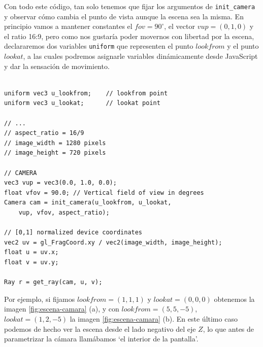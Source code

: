 Con todo este código, tan solo tenemos que fijar los argumentos de \verb|init_camera| y observar cómo cambia el punto de vista aunque la escena sea la misma. En principio vamos a mantener constantes el $fov=90^\circ$, el vector $vup=(0,1,0)$ y el ratio 16:9, pero como nos gustaría poder movernos con libertad por la escena, declararemos dos variables \verb|uniform| que representen el punto $lookfrom$ y el punto $lookat$, a las cuales podremos asignarle variables dinámicamente desde JavaScript y dar la sensación de movimiento.

\begin{lstlisting}

uniform vec3 u_lookfrom;    // lookfrom point
uniform vec3 u_lookat;      // lookat point

// ... 
// aspect_ratio = 16/9
// image_width = 1280 pixels
// image_height = 720 pixels

// CAMERA
vec3 vup = vec3(0.0, 1.0, 0.0);
float vfov = 90.0; // Vertical field of view in degrees
Camera cam = init_camera(u_lookfrom, u_lookat, 
    vup, vfov, aspect_ratio);

// [0,1] normalized device coordinates
vec2 uv = gl_FragCoord.xy / vec2(image_width, image_height);
float u = uv.x;
float v = uv.y;

Ray r = get_ray(cam, u, v);
\end{lstlisting}

Por ejemplo, si fijamos $lookfrom = (1,1,1)$ y $lookat = (0,0,0)$ obtenemos la imagen \ref{fig:escena-camara} (a), y con $lookfrom=(5, 5, -5)$, $lookat=(1,2,-5)$ la imagen \ref{fig:escena-camara} (b). En este último caso podemos de hecho ver la escena desde el lado negativo del eje $Z$, lo que antes de parametrizar la cámara llamábamos `el interior de la pantalla'.

